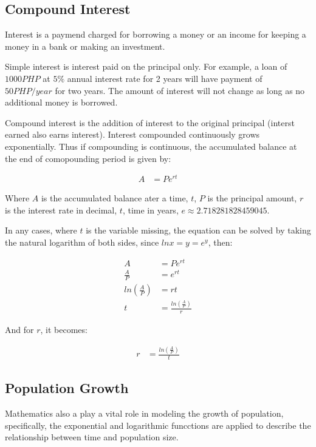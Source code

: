 \documentclass[12pt, UTF8]{article}
\begin{document}
	\subsection*{Compound Interest}

	Interest is a paymend charged for borrowing a money or an income for keeping a money in a bank or making an investment.

	Simple interest is interest paid on the principal only. For example, a loan of $1000 PHP$ at $5\%$ annual interest rate for 2 years will have payment of $50 PHP/year$ for two years. The amount of interest will not change as long as no additional money is borrowed.

	Compound interest is the addition of interest to the original principal (interst earned also earns interest). Interest compounded continuously grows exponentially. Thus if compounding is continuous, the accumulated balance at the end of comopounding period is given by:

	\begin{align}
		A &= Pe^{rt}
	\end{align}

	Where $A$ is the accumulated balance ater a time, $t$, $P$ is the principal amount, $r$ is the interest rate in decimal, $t$, time in years, $e \approx 2.718281828459045$.

	In any cases, where $t$ is the variable missing, the equation can be solved by taking the natural logarithm of both sides, since $ln x = y = e^y$, then:

	\begin{align}
		A &= Pe^{rt} \\
		\frac{A}{P} &= e^{rt}  \nonumber \\
		ln(\frac{A}{P}) &= rt  \nonumber \\
		t &= \frac{ln(\frac{A}{P})}{r}
	\end{align}

	And for $r$, it becomes:

	\begin{align}
		r &= \frac{ln(\frac{A}{P})}{t}
	\end{align}

	\subsection*{Population  Growth}

	Mathematics also a play a vital role in modeling the growth of population, specifically, the exponential and logarithmic funcctions are applied to describe the relationship between time and population size.
\end{document}
